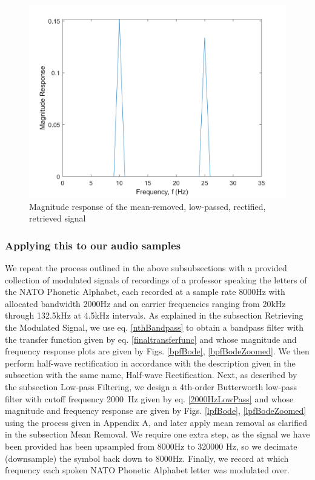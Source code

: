 \documentclass[journal]{IEEEtran}
\begin{document}
\begin{figure}[ht]
	\centering
  \includegraphics[width=\columnwidth]{meanremovedmag.png}
    \caption{Magnitude response of the mean-removed, low-passed, rectified, retrieved signal}   
    \label{meanremovemagresponse}
\end{figure}

\subsubsection{Applying this to our audio samples}
We repeat the process outlined in the above subsubsections with a provided collection of modulated signals of recordings of a professor speaking the letters of the NATO Phonetic Alphabet, each recorded at a sample rate 8000Hz with allocated bandwidth 2000Hz and on carrier frequencies ranging from 20kHz through 132.5kHz at 4.5kHz intervals. As explained in the subsection Retrieving the Modulated Signal, we use eq. \eqref{nthBandpass} to obtain a bandpass filter with the transfer function given by eq. \eqref{finaltransferfunc} and whose magnitude and frequency response plots are given by Figs. \ref{bpfBode}, \ref{bpfBodeZoomed}. We then perform half-wave rectification in accordance with the description given in the subsection with the same name, Half-wave Rectification. Next, as described by the subsection Low-pass Filtering, we design a 4th-order Butterworth low-pass filter with cutoff frequency \SI{2000}{\hertz} given by eq. \eqref{2000HzLowPass} and whose magnitude and frequency response are given by Figs. \ref{lpfBode}, \ref{lpfBodeZoomed} using the process given in Appendix A, and later apply mean removal as clarified in the subsection Mean Removal. We require one extra step, as the signal we have been provided has been upsampled from 8000Hz to 320000 Hz, so we decimate (downsample) the symbol back down to 8000Hz. Finally, we record at which frequency each spoken NATO Phonetic Alphabet letter was modulated over.
\end{document}
